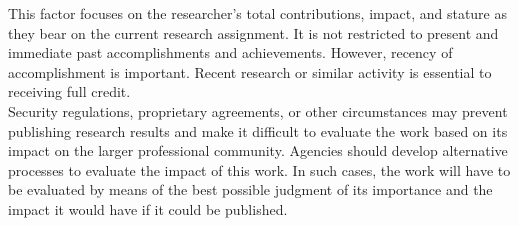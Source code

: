 %

This factor focuses on the researcher's total contributions, impact,
and stature as they bear on the
current research assignment.
It is not restricted to present and immediate past accomplishments 
and achievements.
However, recency of accomplishment is important.
Recent research or similar activity is essential to receiving full
credit. \\
Security regulations, proprietary agreements, or other circumstances may prevent publishing 
research results and make it difficult to evaluate the work based on its impact on the larger 
professional community.
Agencies should develop alternative processes to evaluate the impact
of this work.
In such cases, the work will have to be evaluated by means of the best
possible judgment of its importance and the impact it would have if it
could be published.


